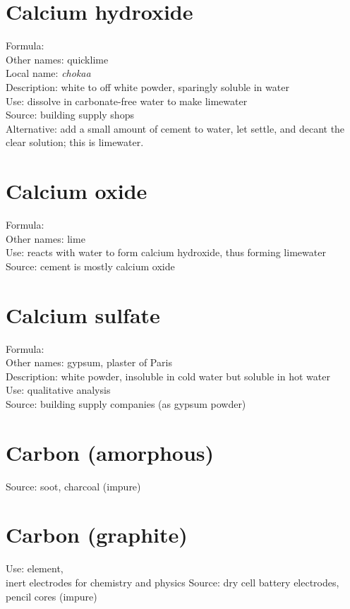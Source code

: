 \section{Calcium hydroxide}
\label{sec:}
Formula: \\
Other names: quicklime\\
Local name: \textit{chokaa}\\
Description: white to off white powder, 
sparingly soluble in water\\
Use: dissolve in carbonate-free water to make limewater\\
Source: building supply shops\\
Alternative: add a small amount of cement to water, 
let settle, 
and decant the clear solution; 
this is limewater.

\section{Calcium oxide}
\label{sec:}
Formula: \\
Other names: lime\\
Use: reacts with water to form calcium hydroxide, 
thus forming limewater\\
Source: cement is mostly calcium oxide

\section{Calcium sulfate}
\label{sec:}
Formula: \\
Other names: gypsum, 
plaster of Paris\\
Description: white powder, 
insoluble in cold water but soluble in hot water\\
Use: qualitative analysis\\
Source: building supply companies (as gypsum powder)

\section{Carbon (amorphous)}
\label{sec:}
Source: soot, 
charcoal (impure)

\section{Carbon (graphite)}
\label{sec:carbongraphite}
Use: element, \\
inert electrodes for chemistry and physics
Source: dry cell battery electrodes, 
pencil cores (impure)

